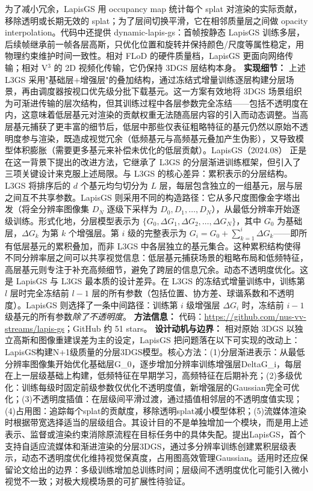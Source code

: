 为了减小冗余，LapisGS 用 occupancy map 统计每个 splat 对渲染的实际贡献，移除透明或长期无效的 splat；为了层间切换平滑，它在相邻质量层之间做 opacity interpolation。代码中还提供 dynamic-lapis-gs：首帧按静态 LapisGS 训练多层，后续帧继承前一帧各层高斯，只优化位置和旋转并保持颜色/尺度等属性稳定，用物理约束维护时间一致性。相对 FLoD 的硬件质量档，LapisGS 更面向网络传输；相对 V$^3$ 的 2D 视频化传输，它仍保持 3DGS 层结构本身。
\textbf{实现细节：} 上述 L3GS 采用"基础层+增强层"的叠加结构，通过冻结式增量训练逐层构建分层场景，再由调度器按视口优先级分批下载基元。这一方案有效地将 3DGS 场景组织为可渐进传输的层次结构，但其训练过程中各层参数完全冻结——包括不透明度在内，这意味着低层基元对渲染的贡献权重无法随高层内容的引入而动态调整。当高层基元捕获了更丰富的细节后，低层中那些仅表征粗略特征的基元仍然以原始不透明度参与渲染，既造成视觉冗余（低频基元与高频基元叠加产生伪影），又导致模型体积膨胀（需要更多基元来补偿未优化的低层贡献）。LapisGS（2024.08） 正是在这一背景下提出的改进方法，它继承了 L3GS 的分层渐进训练框架，但引入了三项关键设计来克服上述局限。与 L3GS 的核心差异：累积表示的分层结构。L3GS 将排序后的 $d$ 个基元均匀切分为 $L$ 层，每层包含独立的一组基元，层与层之间互不共享参数。LapisGS 则采用不同的构造路径：它从多尺度图像金字塔出发（将全分辨率图像集 $D_N$ 逐级下采样为 $D_0, D_1, \ldots, D_N$），从最低分辨率开始逐级训练。形式化地，分层模型表示为 $\{G_0, \Delta G_1, \Delta G_2, \ldots, \Delta G_N\}$，其中 $G_0$ 为基础层，$\Delta G_k$ 为第 $k$ 个增强层。第 $i$ 级的完整表示为 $G_i = G_0 + \sum_{k=1}^{i} \Delta G_k$——即所有低层基元的累积叠加，而非 L3GS 中各层独立的基元集合。这种累积结构使得不同分辨率层之间可以共享视觉信息：低层基元捕获场景的粗略布局和低频特征，高层基元则专注于补充高频细节，避免了跨层的信息冗余。动态不透明度优化。这是 LapisGS 与 L3GS 最本质的设计差异。在 L3GS 的冻结式增量训练中，训练第 $l$ 层时完全冻结前 $l-1$ 层的所有参数（包括位置、协方差、球谐系数和不透明度）。LapisGS 则选择了一条中间路径：训练第 $i$ 级增强层 $\Delta G_i$ 时，冻结前 $i-1$ 级基元的所有参数\textit{除了不透明度}。
\textbf{方法信息：} 代码：\url{https://github.com/nus-vv-streams/lapis-gs}；GitHub 约 51 stars。
\textbf{设计动机与边界：} 相对原始 3DGS 以独立高斯和图像重建误差为主的设定，LapisGS 把问题落在以下可实现的改动上：LapisGS构建N+1级质量的分层3DGS模型。核心方法：(1)分层渐进表示：从最低分辨率图像集开始优化基础层G\_0，逐步增加分辨率训练增强层DeltaG\_i，每层在上一层级基础上构建，低频特征在早期学习，高频特征在后期补充；(2)多级优化：训练每级时固定前级参数仅优化不透明度值，新增强层的Gaussian完全可优化；(3)不透明度插值：在层级间平滑过渡，通过插值相邻层的不透明度值实现；(4)占用图：追踪每个splat的贡献度，移除透明splat减小模型体积；(5)流媒体渲染时根据带宽选择适当的层级组合。其设计目的不是单独增加一个模块，而是用上述表示、监督或渲染约束消除原流程在目标任务中的具体失配。提出LapisGS，首个支持自适应流媒体和渐进渲染的分层3DGS，通过多分辨率训练创建累积层级表示，动态不透明度优化维持视觉保真度，占用图高效管理Gaussian。适用时还应保留论文给出的边界：多级训练增加总训练时间；层级间不透明度优化可能引入微小视觉不一致；对极大规模场景的可扩展性待验证。
